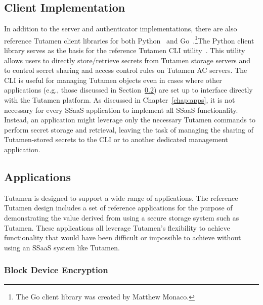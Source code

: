 \subsection{Client Implementation}
\label{chap:tutamen:imp:client}

In addition to the server and authenticator implementations, there are
also reference Tutamen client libraries for both
Python~\cite{src-tutamen-pytutamen} and
Go~\cite{src-tutamen-go}.\footnote{The Go client library was created
  by Matthew Monaco.}The Python client library serves as the basis for
the reference Tutamen CLI utility~\cite{src-tutamen-cli}. This utility
allows users to directly store/retrieve secrets from Tutamen storage
servers and to control secret sharing and access control rules on
Tutamen AC servers. The CLI is useful for managing Tutamen objects
even in cases where other applications (e.g., those discussed in
Section~\ref{chap:tutamen:imp:apps}) are set up to interface directly
with the Tutamen platform. As discussed in Chapter~\ref{chap:apps}, it
is not necessary for every SSaaS application to implement all SSaaS
functionality. Instead, an application might leverage only the
necessary Tutamen commands to perform secret storage and retrieval,
leaving the task of managing the sharing of Tutamen-stored secrets to
the CLI or to another dedicated management application.

\subsection{Applications}
\label{chap:tutamen:imp:apps}

Tutamen is designed to support a wide range of applications.  The
reference Tutamen design includes a set of reference applications for
the purpose of demonstrating the value derived from using a secure
storage system such as Tutamen. These applications all leverage
Tutamen's flexibility to achieve functionality that would have been
difficult or impossible to achieve without using an SSaaS system like
Tutamen.

\subsubsection{Block Device Encryption}

